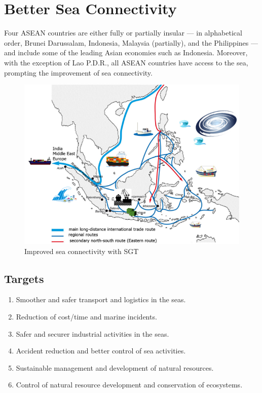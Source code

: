 \section{Better Sea Connectivity} \label{sea}

\tab Four ASEAN countries are either fully or partially insular --- in alphabetical order, Brunei Darussalam, Indonesia, Malaysia (partially), and the Philippines --- and include some of the leading Asian economies such as Indonesia. Moreover, with the exception of Lao P.D.R., all ASEAN countries have access to the sea, prompting the improvement of sea connectivity.

\begin{figure}[H]
\begin{center}
\includegraphics[width = 0.8\linewidth]{Figures/sea_connect.png}
\end{center}
\caption{Improved sea connectivity with SGT}
\label{sea_connect}
\end{figure}

\subsection{Targets}

\begin{enumerate}

\item Smoother and safer transport and logistics in the seas.

\item Reduction of cost/time and marine incidents.

\item Safer and securer industrial activities in the seas.

\item Accident reduction and better control of sea activities.

\item Sustainable management and development of natural resources.

\item Control of natural resource development and conservation of ecosystems.

\end{enumerate}

